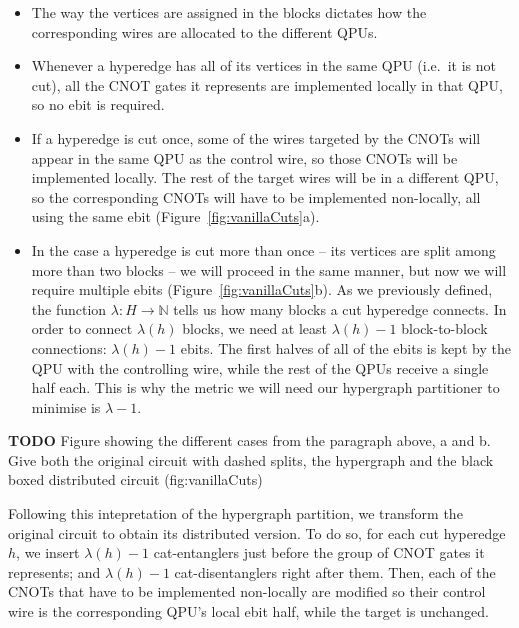 \begin{itemize}

  \item The way the vertices are assigned in the blocks dictates how the corresponding wires are allocated to the different QPUs. 
  \item Whenever a hyperedge has all of its vertices in the same QPU (i.e.\ it is not cut), all the CNOT gates it represents are implemented locally in that QPU, so no ebit is required. 
  \item If a hyperedge is cut once, some of the wires targeted by the CNOTs will appear in the same QPU as the control wire, so those CNOTs will be implemented locally. The rest of the target wires will be in a different QPU, so the corresponding CNOTs will have to be implemented non-locally, all using the same ebit (Figure~\ref{fig:vanillaCuts}a). 
  \item In the case a hyperedge is cut more than once -- its vertices are split among more than two blocks -- we will proceed in the same manner, but now we will require multiple ebits (Figure~\ref{fig:vanillaCuts}b). As we previously defined, the function \(\lambda\colon H \to \mathbb{N}\) tells us how many blocks a cut hyperedge connects. In order to connect \(\lambda(h)\) blocks, we need at least \(\lambda(h)-1\) block-to-block connections: \(\lambda(h)-1\) ebits. The first halves of all of the ebits is kept by the QPU with the controlling wire, while the rest of the QPUs receive a single half each. This is why the metric we will need our hypergraph partitioner to minimise is \(\lambda-1\).
\end{itemize}

\textbf{TODO} Figure showing the different cases from the paragraph above, a and b. Give both the original circuit with dashed splits, the hypergraph and the black boxed distributed circuit (fig:vanillaCuts)


Following this intepretation of the hypergraph partition, we transform the original circuit to obtain its distributed version. To do so, for each cut hyperedge \(h\), we insert \(\lambda(h)-1\) cat-entanglers just before the group of CNOT gates it represents; and \(\lambda(h)-1\) cat-disentanglers right after them. Then, each of the CNOTs that have to be implemented non-locally are modified so their control wire is the corresponding QPU's local ebit half, while the target is unchanged.


